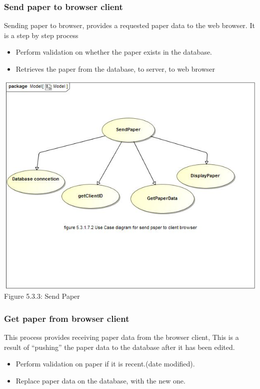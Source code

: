 \documentclass[hidelinks,a4paper,12pt]{article}
\begin{document}
	
		\subsubsection{Send paper to browser client}
	
	Sending paper to browser, provides a requested paper data to the  
	web browser. It is a step by step process
	
	\begin{itemize}
	\item Perform validation on whether the paper exists in the database.
	\item Retrieves the paper from the database, to server, to web browser
\end{itemize}

\includegraphics[width=1\textwidth]{./Graphs/UseCaseforSendPaper.JPG}\\[0.4cm]  
Figure 5.3.3: Send Paper
	
		\subsubsection{Get paper from browser client}
	
	This process provides receiving paper data from the browser client,
	This is a result of “pushing” the paper data to the database after    
	it has been edited. 
	
		\begin{itemize}
			\item Perform validation on paper if it is recent.(date modified).
			\item Replace paper data on the database, with the new one.
		\end{itemize}
		
\end{document}
